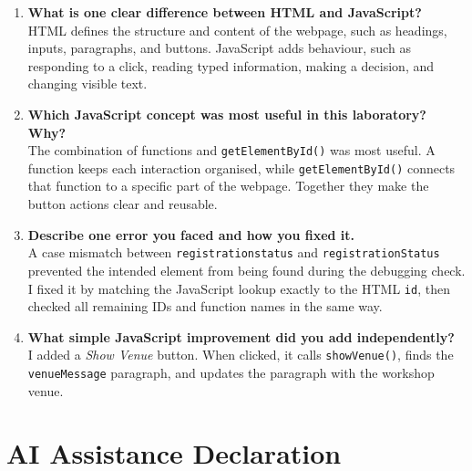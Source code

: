 \documentclass[11pt,a4paper]{article}
\begin{document}
\begin{enumerate}
    \item \textbf{What is one clear difference between HTML and JavaScript?}\\
    HTML defines the structure and content of the webpage, such as headings, inputs, paragraphs, and buttons. JavaScript adds behaviour, such as responding to a click, reading typed information, making a decision, and changing visible text.

    \item \textbf{Which JavaScript concept was most useful in this laboratory? Why?}\\
    The combination of functions and \texttt{getElementById()} was most useful. A function keeps each interaction organised, while \texttt{getElementById()} connects that function to a specific part of the webpage. Together they make the button actions clear and reusable.

    \item \textbf{Describe one error you faced and how you fixed it.}\\
    A case mismatch between \texttt{registrationstatus} and \texttt{registrationStatus} prevented the intended element from being found during the debugging check. I fixed it by matching the JavaScript lookup exactly to the HTML \texttt{id}, then checked all remaining IDs and function names in the same way.

    \item \textbf{What simple JavaScript improvement did you add independently?}\\
    I added a \textit{Show Venue} button. When clicked, it calls \texttt{showVenue()}, finds the \texttt{venueMessage} paragraph, and updates the paragraph with the workshop venue.
\end{enumerate}

\clearpage
\section{AI Assistance Declaration}

\end{document}
